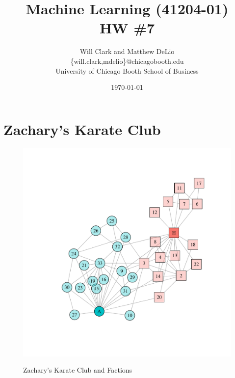 



\title{Machine Learning (41204-01)\\HW \#7}
\author{Will Clark and Matthew DeLio \\
\textsf{\{will.clark,mdelio\}@chicagobooth.edu} \\
University of Chicago Booth School of Business}
\date{\today}
\maketitle

\section{Zachary's Karate Club}

\begin{figure}[!htb]
\centering
\caption{Zachary's Karate Club and Factions}
\includegraphics[scale=.5,trim={0.75in 0.75in 0.75in 0.75in}, clip=True]{karate_network.pdf}
\label{fig:karate_network}
\end{figure}

